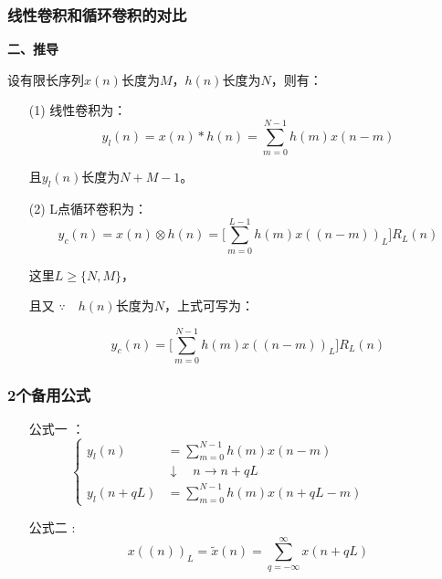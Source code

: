 \documentclass[notheorems,compress,mathserif,table]{beamer}
\begin{document}
\begin{frame}[shrink]\frametitle{线性卷积和循环卷积的对比}%


\textbf{二、推导}

设有限长序列$x(n)$长度为$M$，$h(n)$长度为$N$，则有：
\begin{enumerate}
  \item [(1)] 线性卷积为：
  $$y_l(n) = x(n)*h(n) = \sum_{m=0}^{N-1}h(m)x(n-m) $$
  \par 且$y_l(n)$长度为$N+M-1$。
  \item [(2)] L点循环卷积为：
  $$y_c(n) = x(n)\otimes h(n) =  \bigg[ \sum_{m=0}^{L-1} h(m) x((n-m))_L \bigg] R_L(n) $$

  这里$L\geq \{N,M\}$，

  且又 $\because\quad h(n)$长度为$N$，上式可写为：

  $$y_c(n) %
        =  \bigg[ \sum_{m=0}^{N-1} h(m) x((n-m))_L \bigg] R_L(n) $$

  \end{enumerate}
\end{frame}



\begin{frame}[shrink]\frametitle{2个备用公式}%

\begin{enumerate}
  \item [公式一]：
  \begin{equation*} %
  \left\{ \begin{aligned}
  y_l(n)      &=  \sum_{m=0}^{N-1}h(m)x(n-m)     \quad\quad\quad\quad\quad\quad\quad\\
              &\downarrow    \quad n\rightarrow n+qL             \\
  y_l(n+qL)   &=  \sum_{m=0}^{N-1}h(m)x(n+qL-m)
  \end{aligned} \right.
  \end{equation*}
  \item  [公式二]:
  $$x((n))_L = \tilde{x}(n) = \sum_{q=-\infty}^{\infty}x(n+qL) $$
  \end{enumerate}
\end{frame}
\end{document}

